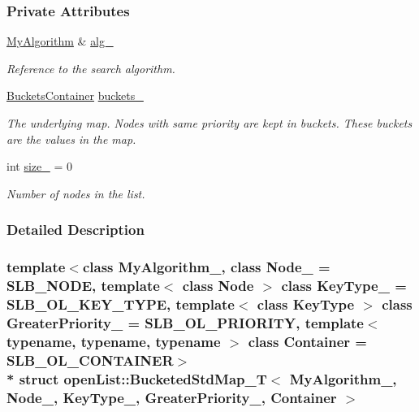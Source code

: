 \subsubsection*{Private Attributes}
\begin{DoxyCompactItemize}
\item 
\hyperlink{structopenList_1_1BucketedStdMap__T_a40b0529a53dfea9e6a9c5c7944ee5b62}{My\+Algorithm} \& \hyperlink{structopenList_1_1BucketedStdMap__T_aa20d03d995461678e9d2d17ec6366295}{alg\+\_\+}\hypertarget{structopenList_1_1BucketedStdMap__T_aa20d03d995461678e9d2d17ec6366295}{}\label{structopenList_1_1BucketedStdMap__T_aa20d03d995461678e9d2d17ec6366295}

\begin{DoxyCompactList}\small\item\em Reference to the search algorithm. \end{DoxyCompactList}\item 
\hyperlink{structopenList_1_1BucketedStdMap__T_a7f443991a1790368ac96f78206e87ec9}{Buckets\+Container} \hyperlink{structopenList_1_1BucketedStdMap__T_a045e354f46d9d09cbec7dc4aa4e45de4}{buckets\+\_\+}\hypertarget{structopenList_1_1BucketedStdMap__T_a045e354f46d9d09cbec7dc4aa4e45de4}{}\label{structopenList_1_1BucketedStdMap__T_a045e354f46d9d09cbec7dc4aa4e45de4}

\begin{DoxyCompactList}\small\item\em The underlying map. Nodes with same priority are kept in buckets. These buckets are the values in the map. \end{DoxyCompactList}\item 
int \hyperlink{structopenList_1_1BucketedStdMap__T_ab0452f7821f0d9e4a47c2d83e9ca72f1}{size\+\_\+} = 0\hypertarget{structopenList_1_1BucketedStdMap__T_ab0452f7821f0d9e4a47c2d83e9ca72f1}{}\label{structopenList_1_1BucketedStdMap__T_ab0452f7821f0d9e4a47c2d83e9ca72f1}

\begin{DoxyCompactList}\small\item\em Number of nodes in the list. \end{DoxyCompactList}\end{DoxyCompactItemize}


\subsubsection{Detailed Description}
\subsubsection*{template$<$class My\+Algorithm\+\_\+, class Node\+\_\+ = S\+L\+B\+\_\+\+N\+O\+DE, template$<$ class Node $>$ class Key\+Type\+\_\+ = S\+L\+B\+\_\+\+O\+L\+\_\+\+K\+E\+Y\+\_\+\+T\+Y\+PE, template$<$ class Key\+Type $>$ class Greater\+Priority\+\_\+ = S\+L\+B\+\_\+\+O\+L\+\_\+\+P\+R\+I\+O\+R\+I\+TY, template$<$ typename, typename, typename $>$ class Container = S\+L\+B\+\_\+\+O\+L\+\_\+\+C\+O\+N\+T\+A\+I\+N\+ER$>$\\*
struct open\+List\+::\+Bucketed\+Std\+Map\+\_\+\+T$<$ My\+Algorithm\+\_\+, Node\+\_\+, Key\+Type\+\_\+, Greater\+Priority\+\_\+, Container $>$}

